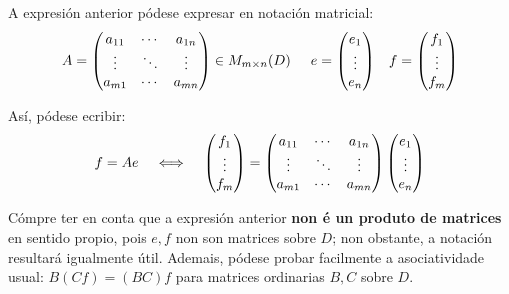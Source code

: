 \documentclass[twoside]{report}
\theoremstyle{mystyle}
\begin{document}
\noindent A expresión anterior pódese expresar en notación matricial:\\

$$
A = \begin{pmatrix}
a_{11} & \cdots & a_{1n}\\
\vdots & \ddots & \vdots\\
a_{m1} & \cdots & a_{mn}
\end{pmatrix} \in M_{m \times n}(D)
\hspace{5mm}
e = \begin{pmatrix}
e_{1} \\ \vdots \\ e_{n}
\end{pmatrix}
\hspace{3mm}
f = \begin{pmatrix}
f_{1} \\ \vdots \\ f_{m}
\end{pmatrix}
$$

\vspace{5mm}

\noindent Así, pódese ecribir:\\

$$
f = Ae \hspace{4mm} \Longleftrightarrow \hspace{4mm}
\begin{pmatrix}
f_{1} \\ \vdots \\ f_{m}
\end{pmatrix}
=
\begin{pmatrix}
a_{11} & \cdots & a_{1n}\\
\vdots & \ddots & \vdots\\
a_{m1} & \cdots & a_{mn}
\end{pmatrix} 
\begin{pmatrix}
e_{1} \\ \vdots \\ e_{n}
\end{pmatrix}
$$

\vspace{3mm}

\noindent Cómpre ter en conta que a expresión anterior \textbf{non é un produto de matrices} en sentido propio, pois $e,f$ non son matrices sobre $D$; non obstante, a notación resultará igualmente útil. Ademais, pódese probar facilmente a asociatividade usual: $B(Cf) = (BC)f$ para matrices ordinarias $B,C$ sobre $D$.\\
\end{document}

